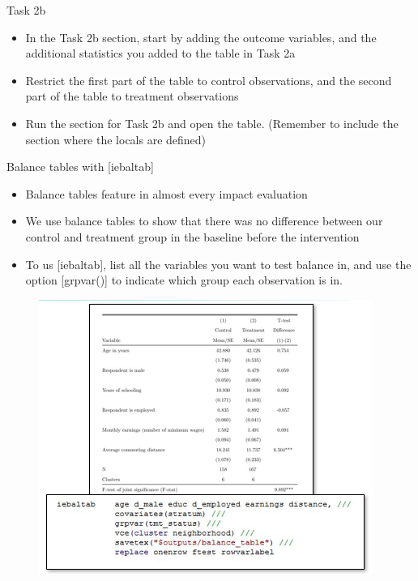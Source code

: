 \documentclass[aspectratio=169]{beamer}
\begin{document}
\begin{frame}{Task 2b}
\begin{itemize}
	\item In the Task 2b section, start by adding the outcome variables, and the additional statistics you added to the table in Task 2a
	\item Restrict the first part of the table to control observations, and the second part of the table to treatment observations
	\item Run the section for Task 2b and open the table. (Remember to include the section where the locals are defined)
\end{itemize}
\end{frame}


\begin{frame}[fragile]{Balance tables with [iebaltab]}
\begin{multicols}{2}	
	\begin{itemize}
		\item Balance tables feature in almost every impact evaluation
		\item We use balance tables to show that there was no difference between our control and treatment group in the baseline before the intervention
		\item To us [iebaltab], list all the variables you want to test balance in, and use the option [grpvar()] to indicate which group each observation is in. 
	\end{itemize}
	\begin{figure}
		\centering
		\includegraphics[width=\linewidth]{img/iedbaltab}
	\end{figure}
\end{multicols}
\end{frame}
\end{document}
